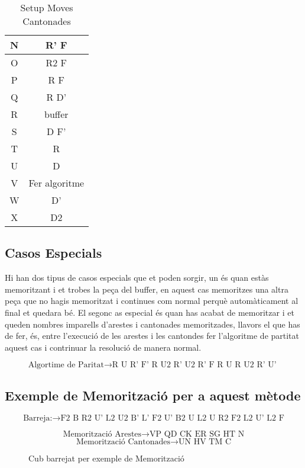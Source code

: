 \begin{table}[h]
\begin{minipage}{.5\linewidth}
\begin{tabular}{|c|c|}
            N & R' F          \\ 
            \hline
            O & R2 F          \\ 
            \hline
            P & R F           \\ 
            \hline
            Q & R D'          \\ 
            \hline
            R & buffer        \\ 
            \hline
            S & D F'          \\ 
            \hline
            T & R             \\ 
            \hline
            U & D             \\ 
            \hline
            V & Fer algoritme \\ 
            \hline
            W & D'            \\ 
            \hline
            X & D2            \\ 
            \hline
        \end{tabular}
    \end{minipage} 
    \caption{Setup Moves Cantonades}
    \label{fig:setup-cantonades}
\end{table}

\subsection{Casos Especials}

Hi han dos tipus de casos especials que et poden sorgir, un és quan estàs memoritzant i et trobes la peça del buffer, en aquest cas memoritzes una altra peça que no hagis memoritzat i continues com normal perquè automàticament al final et quedara bé.
El segonc as especial és quan has acabat de memoritzar i et queden nombres imparells d'arestes i cantonades memoritzades, llavors el que has de fer, és, entre l'execució de les arestes i les cantondes fer l'algoritme de partitat aquest cas i contrinuar la resolució de manera normal.

$$ \textrm{Algortime de Paritat} \rightarrow \textrm{R U R' F' R U2 R' U2 R' F R U R U2 R' U' } $$

\subsection{Exemple de Memorització per a aquest mètode}

$$ \textrm{Barreja:} \rightarrow \textrm{F2 B R2 U' L2 U2 B' L' F2 U' B2 U L2 U R2 F2 L2 U' L2 F} $$

$$ \textrm{Memorització Arestes} \rightarrow \textrm{VP QD CK ER SG HT N}$$
$$ \textrm{Memorització Cantonades} \rightarrow \textrm{UN HV TM C}$$

\begin{figure}[!ht]
    \centering\RubikCubeSolvedWY
    \caption{Cub barrejat per exemple de Memorització}
    \label{fig:exemple-memo}
    \end{figure}


